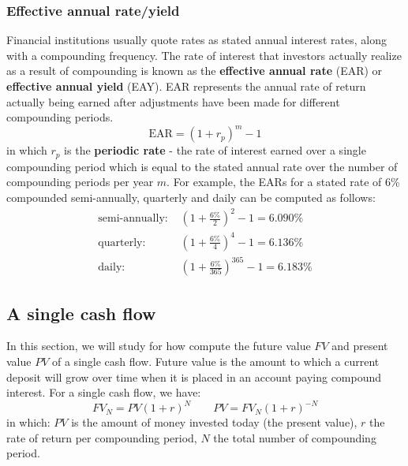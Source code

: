 \subsubsection{Effective annual rate/yield}
Financial institutions usually quote rates as stated annual interest rates, along with a compounding frequency. The rate of interest that investors actually realize as a result of compounding is known as the \textbf{effective annual rate} (EAR) or \textbf{effective annual yield} (EAY). EAR represents the annual rate of return actually being earned after adjustments have been made for different compounding periods.
\begin{equation}
	\text{EAR} = (1 + r_p)^m - 1
\end{equation}
in which $r_p$ is the \textbf{periodic rate} - the rate of interest earned over a single compounding period which is equal to the stated annual rate over the number of compounding periods per year $m$. For example, the EARs for a stated rate of 6\% compounded semi-annually, quarterly and daily can be computed as follows:
\begin{align*}
	\text{semi-annually: } & \left( 1 + \frac{6\%}{2} \right)^2 - 1     = 6.090\% \\
	\text{quarterly: }     & \left( 1 + \frac{6\%}{4} \right)^4 - 1     = 6.136\% \\
	\text{daily: }         & \left( 1 + \frac{6\%}{365} \right)^{365} - 1 = 6.183\% 
\end{align*}



\subsection{A single cash flow}
In this section, we will study for how compute the future value $FV$ and present value $PV$ of a single cash flow. Future value is the amount to which a current deposit will grow over time when it is placed in an account paying compound interest. For a single cash flow, we have:
\begin{equation}
    FV_{N} = PV (1 + r)^{N} \quad\quad PV = FV_{N} (1 + r)^{-N}
\end{equation}
in which: $PV$ is the amount of money invested today (the present value), $r$ the rate of return per compounding period, $N$ the total number of compounding period. 

\newcommand{\timb}{{"0","1","...","N-1","N"}}
\newcommand{\tvmb}{{"$PV$","","","","$FV = PV(1 + r)^{N}$"}}
\begin{center}
\end{center}


